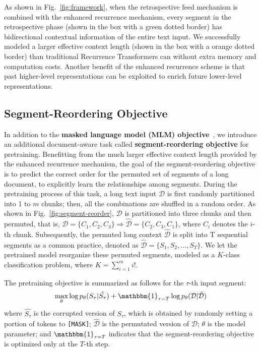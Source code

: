\documentclass[11pt,a4paper]{article}
\begin{document}
As shown in Fig.~\ref{fig:framework}, when the retrospective feed mechanism is combined with the enhanced recurrence mechanism, every segment in the retrospective phase (shown in the box with a green dotted border) has bidirectional contextual information of the entire text input. We successfully modeled a larger effective context length (shown in the box with a orange dotted border) than traditional Recurrence Transformers can without extra memory and computation costs. Another benefit of the enhanced recurrence scheme is that past higher-level representations can be exploited to enrich future lower-level representations. 


\subsection{Segment-Reordering Objective}\label{sec:sent-reorder}
In addition to the \textbf{masked language model (MLM) objective}~\citep{devlin2018bert}, we introduce an additional document-aware task called \textbf{segment-reordering objective} for pretraining. Benefitting from the much larger effective context length provided by the enhanced recurrence mechanism, the goal of the segment-reordering objective is to predict the correct order for the permuted set of segments of a long document, to explicitly learn the relationships among segments. During the pretraining process of this task, a long text input $\mathcal{D}$ is first randomly partitioned into 1 to $m$ chunks; then, all the combinations are shuffled in a random order. As shown in Fig.~\ref{fig:segment-reorder}, $\mathcal{D}$ is partitioned into three chunks and then permuted, that is, $\mathcal{D} = \{ C_1, C_2, C_3\} \Longrightarrow \mathcal{\hat{D}} = \{ C_2, C_3, C_1\}$, where $C_i$ denotes the $i$-th chunk. Subsequently, the permuted long context $\mathcal{\hat{D}}$ is split into T sequential segments as a common practice, denoted as $\mathcal{\hat{D}}=\{S_1, S_2, ..., S_T\}$. We let the pretrained model reorganize these permuted segments, modeled as a $K$-class classification problem, where $K = \sum_{i=1}^m i!$. 

The pretraining objective is summarized as follows for the $\tau$-th input segment: 
\begin{equation}
    \max_\theta \log p_\theta(S_\tau|\hat{S_\tau}) + \mathbbm{1}_{\tau=T} \log p_\theta(\mathcal{D}|\mathcal{\hat{D}}) \nonumber
\end{equation}
where $\hat{S_\tau}$ is the corrupted version of $S_\tau$, which is obtained by randomly setting a portion of tokens to \texttt{[MASK]}; $\mathcal{\hat{D}}$ is the permutated version of $\mathcal{D}$; $\theta$ is the model parameter; and $\mathbbm{1}_{\tau=T}$ indicates that the segment-reordering objective is optimized only at the $T$-th step.
\end{document}
